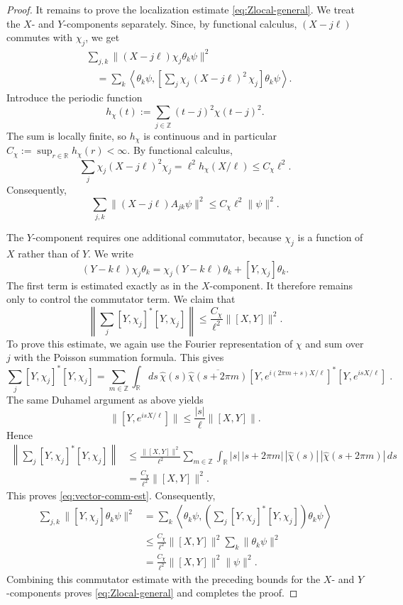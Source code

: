 \documentclass[11pt]{amsart}
\theoremstyle{definition}
\numberwithin{equation}{section}
\newcommand{\R}{\mathbb R}
\newcommand{\Z}{\mathbb Z}
\newcommand{\1}{\mathbf 1}
\begin{document}
\begin{proof}
It remains to prove the localization estimate \eqref{eq:Zlocal-general}. We treat the $X$- and $Y$-components separately.
Since, by functional calculus, $(X-j\ell)$ commutes with $\chi_j$, we get 
\begin{align*}
 &\sum_{j,k}\|(X-j\ell)\chi_j\theta_k\psi\|^2\\
 &\quad=
 \sum_k
 \left\langle
 \theta_k\psi,
 \left[
 \sum_j\chi_j\,(X-j\ell)^2\,\chi_j
 \right]
 \theta_k\psi
 \right\rangle.
\end{align*}
Introduce the periodic function
\[
 h_\chi(t):=
 \sum_{j\in\mathbb Z}(t-j)^2\chi(t-j)^2 .
\]
The sum is locally finite, so \(h_\chi\) is continuous and in particular
\(
 C_\chi:=\sup_{r\in\mathbb R}h_\chi(r)<\infty.
\)
By functional calculus,
\[
 \sum_j\chi_j(X-j\ell)^2\chi_j
 =
 \ell^2h_\chi(X/\ell)
 \le C_\chi\ell^2.
\]
Consequently,
\begin{equation*}
 \sum_{j,k}\|(X-j\ell)A_{jk}\psi\|^2
 \le 
 C_\chi\ell^2\|\psi\|^2.
 \label{eq:X-local-piece}
\end{equation*}

The $Y$-component requires one additional commutator, because $\chi_j$ is a function of $X$ rather than of $Y$. We write
\[
 (Y-k\ell)\chi_j\theta_k
 =
 \chi_j(Y-k\ell)\theta_k+[Y,\chi_j]\theta_k.
\]
The first term is estimated exactly as in the $X$-component. It therefore remains only to control the commutator term. We claim that
\begin{equation}\label{eq:vector-comm-est}
 \left\|\sum_j[Y,\chi_j]^*[Y,\chi_j]\right\|
 \le \frac{C_\chi}{\ell^2}\|[X,Y]\|^2.
\end{equation}
To prove this estimate, we again use the Fourier representation of $\chi$ and sum over $j$ with the Poisson summation formula. This gives
\[
 \sum_j[Y,\chi_j]^*[Y,\chi_j] = \sum_{m \in \Z}\int_{\R}ds\,\hat{\chi}(s)\overline{\hat{\chi}(s + 2\pi m)}\left[Y, e^{i(2\pi m + s) X/\ell}\right]^* \left[Y, e^{i s X/ \ell}\right]\;.
\]
The same Duhamel argument as above yields
\[
 \|\left[Y,e^{isX/\ell}\right]\|
 \le \frac{|s|}{\ell}\|[X,Y]\|.
\]
Hence
\begin{align*}
 \left\|\sum_j[Y,\chi_j]^*[Y,\chi_j]\right\|
 &\le \frac{\|[X,Y]\|^2}{\ell^2}
 \sum_{m\in\Z}\int_{\R}
 |s|\,| s +2\pi m|\,
 |\widehat\chi(s)|\,|\widehat\chi(s + 2\pi m )|\,ds\\
 &=\frac{C_\chi}{\ell^2}\|[X,Y]\|^2.
\end{align*}
This proves \eqref{eq:vector-comm-est}. Consequently,
\begin{align*}
 \sum_{j,k}\|[Y,\chi_j]\theta_k\psi\|^2
 &=
 \sum_k
 \left\langle
 \theta_k\psi,
 \left(\sum_j[Y,\chi_j]^*[Y,\chi_j]\right)
 \theta_k\psi
 \right\rangle\\
 &\le
 \frac{C_\chi}{\ell^2}\|[X,Y]\|^2
 \sum_k\|\theta_k\psi\|^2\\
 &=
 \frac{C_\chi}{\ell^2}\|[X,Y]\|^2\|\psi\|^2.
\end{align*}
Combining this commutator estimate with the preceding bounds for the $X$- and $Y$-components proves \eqref{eq:Zlocal-general} and completes the proof.
\end{proof}
\end{document}
